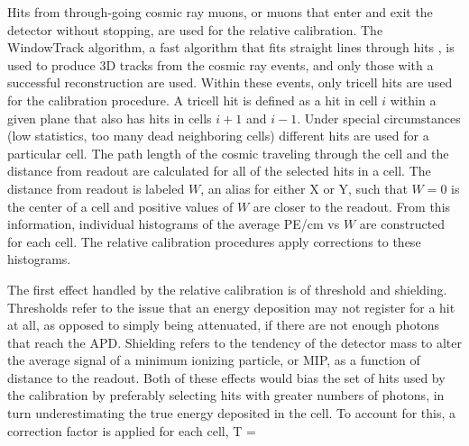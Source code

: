 Hits from through-going cosmic ray muons, or muons that enter and exit the detector without stopping, are used for the relative calibration. The WindowTrack algorithm, a fast algorithm that fits straight lines through hits \cite{ref:RecoWinTrack}, is used to produce $3$D tracks from the cosmic ray events, and only those with a successful reconstruction are used. Within these events, only tricell hits are used for the calibration procedure. A tricell hit is defined as a hit in cell $i$ within a given plane that also has hits in cells $i+1$ and $i-1$. Under special circumstances (low statistics, too many dead neighboring cells) different hits are used for a particular cell. The path length of the cosmic traveling through the cell and the distance from readout are calculated for all of the selected hits in a cell. The distance from readout is labeled $W$, an alias for either X or Y, such that $W = 0$ is the center of a cell and positive values of $W$ are closer to the readout. From this information, individual histograms of the average PE/cm vs $W$ are constructed for each cell. The relative calibration procedures apply corrections to these histograms.

The first effect handled by the relative calibration is of threshold and shielding. Thresholds refer to the issue that an energy deposition may not register for a hit at all, as opposed to simply being attenuated, if there are not enough photons that reach the APD. Shielding refers to the tendency of the detector mass to alter the average signal of a minimum ionizing particle, or MIP, as a function of distance to the readout. Both of these effects would bias the set of hits used by the calibration by preferably selecting hits with greater numbers of photons, in turn underestimating the true energy deposited in the cell. To account for this, a correction factor is applied for each cell,
\beq
T =  \cdot {}
\label{eq:CalibThreshold}
\eeq


